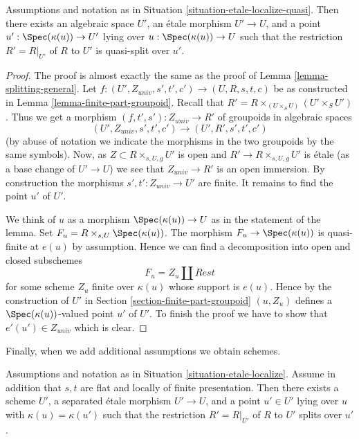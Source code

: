 \begin{lemma}
\label{lemma-quasi-splitting-general}
Assumptions and notation as in
Situation \ref{situation-etale-localize-quasi}.
Then there exists an algebraic space $U'$, an \'etale morphism
$U' \to U$, and a point $u' : \Spec(\kappa(u)) \to U'$
lying over $u : \Spec(\kappa(u)) \to U$
such that the restriction $R' = R|_{U'}$ of $R$ to $U'$
is quasi-split over $u'$.
\end{lemma}

\begin{proof}
The proof is almost exactly the same as the proof of
Lemma \ref{lemma-splitting-general}.
Let $f : (U', Z_{univ}, s', t', c') \to (U, R, s, t, c)$ be as constructed in
Lemma \ref{lemma-finite-part-groupoid}.
Recall that $R' = R \times_{(U \times_S U)} (U' \times_S U')$.
Thus we get a morphism $(f, t', s') : Z_{univ} \to R'$ of groupoids
in algebraic spaces
$$
(U', Z_{univ}, s', t', c') \to (U', R', s', t', c')
$$
(by abuse of notation we indicate the morphisms in the two groupoids
by the same symbols). Now, as $Z \subset R \times_{s, U, g} U'$ is open
and $R' \to R \times_{s, U, g} U'$ is \'etale (as a base change
of $U' \to U$) we see that $Z_{univ} \to R'$ is an open immersion.
By construction the morphisms $s', t' : Z_{univ} \to U'$ are finite.
It remains to find the point $u'$ of $U'$.

\medskip\noindent
We think of $u$ as a morphism $\Spec(\kappa(u)) \to U$ as in
the statement of the lemma. Set $F_u = R \times_{s, U} \Spec(\kappa(u))$.
The morphism $F_u \to \Spec(\kappa(u))$ is quasi-finite at $e(u)$
by assumption. Hence we can find a decomposition into open and closed
subschemes
$$
F_u = Z_u \coprod Rest
$$
for some scheme $Z_u$ finite over $\kappa(u)$ whose support is $e(u)$.
Hence by the construction of $U'$ in
Section \ref{section-finite-part-groupoid}
$(u, Z_u)$ defines a $\Spec(\kappa(u))$-valued
point $u'$ of $U'$. To finish the proof we have to show that
$e'(u') \in Z_{univ}$ which is clear.
\end{proof}

\noindent
Finally, when we add additional assumptions we obtain schemes.

\begin{lemma}
\label{lemma-splitting-scheme}
Assumptions and notation as in
Situation \ref{situation-etale-localize}.
Assume in addition that $s, t$ are flat and locally of finite presentation.
Then there exists a scheme $U'$, a separated \'etale morphism
$U' \to U$, and a point $u' \in U'$
lying over $u$ with $\kappa(u) = \kappa(u')$
such that the restriction $R' = R|_{U'}$ of $R$ to $U'$
splits over $u'$.
\end{lemma}

